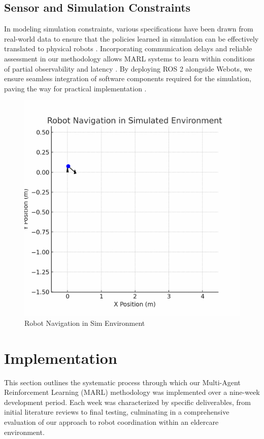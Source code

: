 \documentclass[conference]{IEEEtran}
\begin{document}
\subsection{Sensor and Simulation Constraints}
In modeling simulation constraints, various specifications have been drawn from real-world data to ensure that the policies learned in simulation can be effectively translated to physical robots \citep{yang2022}. Incorporating communication delays and reliable assessment in our methodology allows MARL systems to learn within conditions of partial observability and latency \citep{liu2023}. By deploying ROS 2 alongside Webots, we ensure seamless integration of software components required for the simulation, paving the way for practical implementation \citep{ztouni2021}.
\begin{figure}
    \centering
    \includegraphics[width=1\linewidth]{image.png}
    \caption{Robot Navigation in Sim Environment}
    \label{fig:placeholder}
\end{figure}
\section{Implementation}
\label{sec:implementation}
This section outlines the systematic process through which our Multi-Agent Reinforcement Learning (MARL) methodology was implemented over a nine-week development period. Each week was characterized by specific deliverables, from initial literature reviews to final testing, culminating in a comprehensive evaluation of our approach to robot coordination within an eldercare environment.
\end{document}
